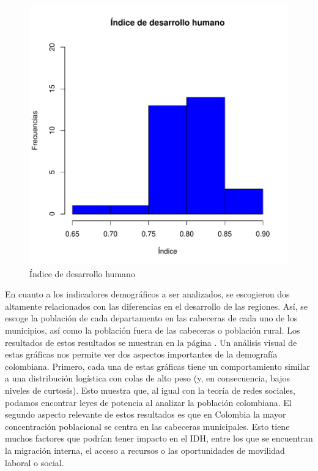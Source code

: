 \documentclass{article}
\begin{document}
\begin{figure}[h]
\centering
\includegraphics{Articulo1-histIDH}
\caption{Índice de desarrollo humano}
\label{barplots}
\end{figure}

En cuanto a los indicadores demográficos a ser analizados, se escogieron dos altamente relacionados con las diferencias en el desarrollo de las regiones. Así, se escoge la población de cada departamento en las cabeceras de cada uno de los municipios, así como la población fuera de las cabeceras o población rural. Los resultados de estos resultados se muestran en la página \pageref{barplot2}. Un análisis visual de estas gráficas nos permite ver dos aspectos importantes de la demografía colombiana. Primero, cada una de estas gráficas tiene un comportamiento similar a una distribución logística con colas de alto peso (y, en consecuencia, bajos niveles de curtosis). Esto muestra que, al igual con la teoría de redes sociales, podamos encontrar leyes de potencia al analizar la población colombiana. El segundo aspecto relevante de estos resultados es que en Colombia la mayor concentración poblacional se centra en las cabeceras municipales. Esto tiene muchos factores que podrían tener impacto en el IDH, entre los que se encuentran la migración interna, el acceso a recursos o las oportunidades de movilidad laboral o social.
\clearpage
\end{document}
